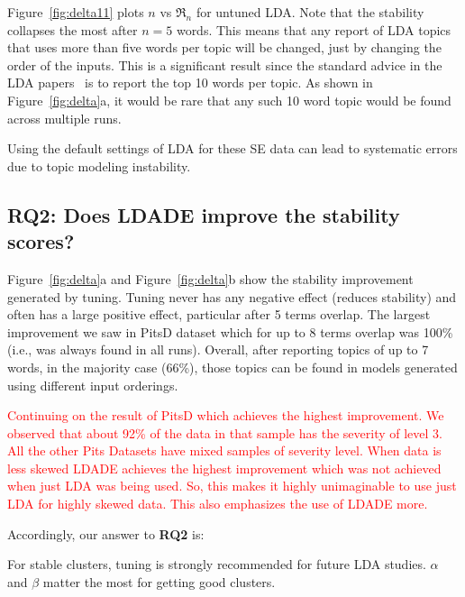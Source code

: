 \documentclass[twocolumn,5p,sort&compress]{elsarticle}
\theoremstyle{break}
\begin{document}
Figure~\ref{fig:delta11}   plots $n$ vs $\Re_n$ for untuned  LDA.
Note that the  stability collapses the most after $n=5$ words. This means
  that any report of LDA topics that uses more than five words per topic will
  be changed, just by changing the order of the inputs. This is a significant result
  since the standard advice in the LDA papers~\cite{panichella2013effectively, lukins2010bug}
  is to report the top 10 words per topic. As shown in Figure~\ref{fig:delta}a, it would
  be rare that any such 10 word topic would be found across multiple runs.
 \begin{lesson}
  Using the default settings of LDA for these SE data can lead to systematic errors due to topic
  modeling instability. 
\end{lesson}

\subsection{\textbf{RQ2: Does LDADE improve the stability scores?}}\label{sect:stable}

 Figure~\ref{fig:delta}a and Figure~\ref{fig:delta}b show the stability improvement
 generated by tuning.
   Tuning never
  has any negative effect (reduces stability) and often has a large positive effect,
  particular  after 5 terms overlap.
   The largest improvement  we
   saw  in PitsD dataset which for up to 8 terms overlap was 100\% (i.e., was always
   found in all runs).
   Overall, after reporting topics of up to 7 words, in the majority case (66\%),
  those topics can be found in models generated using different input orderings.
  
  \textcolor{red}{Continuing on the result of PitsD which achieves the highest improvement. We observed that  about 92\% of the data in that sample has the severity of level 3.  All the other Pits Datasets have mixed samples of severity level. When data is less skewed LDADE achieves the highest improvement which was not achieved when just LDA was being used. So, this makes it highly unimaginable to use just LDA for highly skewed data. This also emphasizes the use of LDADE more. 
  }
  
  Accordingly, our answer to {\bf RQ2} is:

\begin{lesson}
For stable clusters, tuning is strongly recommended for future LDA studies. $\alpha$ and $\beta$ matter the most for getting good clusters.
\end{lesson}
\end{document}
